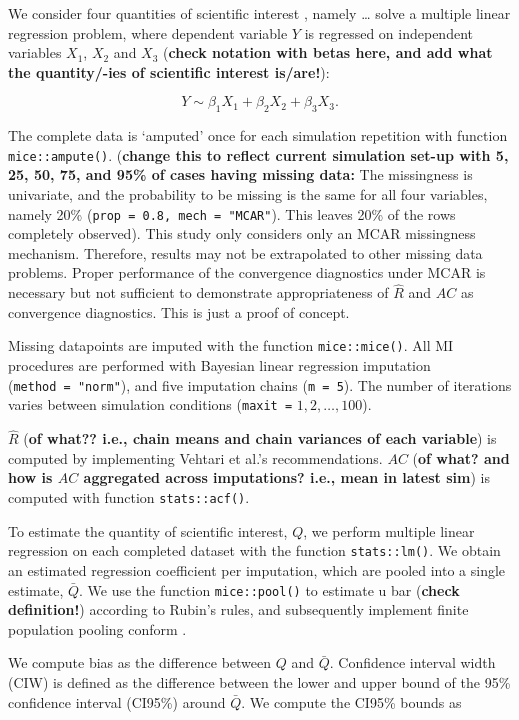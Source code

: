 \documentclass[Royal,times,sageh]{sagej}
\begin{document}
We consider four quantities of scientific interest \citep[`conceptual
estimands';][]{morr19}, namely \ldots{} solve a multiple linear
regression problem, where dependent variable \(Y\) is regressed on
independent variables \(X_1\), \(X_2\) and \(X_3\) (\textbf{check
notation with betas here, and add what the quantity/-ies of scientific
interest is/are!}):

\[Y \sim \beta_1 X_1 + \beta_2 X_2 + \beta_3 X_3.\]

The complete data is `amputed' once for each simulation repetition with
function \texttt{mice::ampute()}. (\textbf{change this to reflect
current simulation set-up with 5, 25, 50, 75, and 95\% of cases having
missing data:} The missingness is univariate, and the probability to be
missing is the same for all four variables, namely 20\%
(\texttt{prop\ =\ 0.8,\ mech\ =\ "MCAR"}). This leaves 20\% of the rows
completely observed). This study only considers only an MCAR missingness
mechanism. Therefore, results may not be extrapolated to other missing
data problems. Proper performance of the convergence diagnostics under
MCAR is necessary but not sufficient to demonstrate appropriateness of
\(\widehat{R}\) and \(AC\) as convergence diagnostics. This is just a
proof of concept.

Missing datapoints are imputed with the function \texttt{mice::mice()}.
All MI procedures are performed with Bayesian linear regression
imputation (\texttt{method\ =\ "norm"}), and five imputation chains
(\texttt{m\ =\ 5}). The number of iterations varies between simulation
conditions (\texttt{maxit\ =} \(1, 2, \dots, 100\)).

\(\widehat{R}\) (\textbf{of what?? i.e., chain means and chain variances
of each variable}) is computed by implementing Vehtari et al.'s
\citeyearpar{veht19} recommendations. \(AC\) (\textbf{of what? and how
is \(AC\) aggregated across imputations? i.e., mean in latest sim}) is
computed with function \texttt{stats::acf()}.

To estimate the quantity of scientific interest, \(Q\), we perform
multiple linear regression on each completed dataset with the function
\texttt{stats::lm()}. We obtain an estimated regression coefficient per
imputation, which are pooled into a single estimate, \(\bar{Q}\). We use
the function \texttt{mice::pool()} to estimate u bar (\textbf{check
definition!}) according to Rubin's \citeyearpar{rubin87} rules, and
subsequently implement finite population pooling conform \citet{vink14}.

We compute bias as the difference between \(Q\) and \(\bar{Q}\).
Confidence interval width (CIW) is defined as the difference between the
lower and upper bound of the 95\% confidence interval (CI95\%) around
\(\bar{Q}\). We compute the CI95\% bounds as
\end{document}
